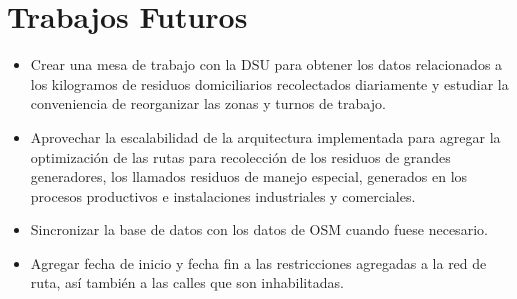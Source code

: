 \section {Trabajos Futuros}

\begin{itemize}
    \item Crear una mesa de trabajo con la DSU para obtener los datos relacionados a los kilogramos de residuos domiciliarios recolectados diariamente y estudiar la conveniencia de reorganizar las zonas y turnos de trabajo.
    \item Aprovechar la escalabilidad de la arquitectura implementada para agregar la optimización de las rutas para recolección de los residuos de grandes generadores, los llamados residuos de manejo especial, generados en los procesos productivos e instalaciones industriales y comerciales.
    \item Sincronizar la base de datos con los datos de OSM cuando fuese necesario.
    \item Agregar fecha de inicio y fecha fin a las restricciones agregadas a la red de ruta, así también a las calles que son inhabilitadas.
\end{itemize}



